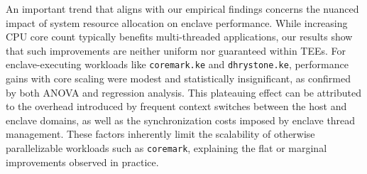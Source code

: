 An important trend that aligns with our empirical findings concerns the nuanced impact of system resource allocation on enclave performance. While increasing CPU core count typically benefits multi-threaded applications, our results show that such improvements are neither uniform nor guaranteed within TEEs. For enclave-executing workloads like \texttt{coremark.ke} and \texttt{dhrystone.ke}, performance gains with core scaling were modest and statistically insignificant, as confirmed by both ANOVA and regression analysis. This plateauing effect can be attributed to the overhead introduced by frequent context switches between the host and enclave domains, as well as the synchronization costs imposed by enclave thread management. These factors inherently limit the scalability of otherwise parallelizable workloads such as \texttt{coremark}, explaining the flat or marginal improvements observed in practice.
